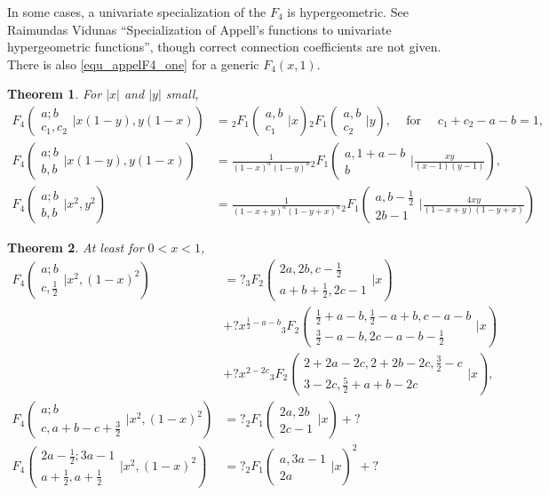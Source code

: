 \documentclass[12pt]{article}
\numberwithin{equation}{section}
\newtheorem{theorem}{Theorem}[section]
\newcommand{\Head}[3] {{}_{#1}{#2}_{#3}}
\newcommand{\ArgS}[3] {( \begin{smallmatrix} #1 \\ #2 \end{smallmatrix} | {#3})}
\newcommand{\appellFfourS}[6]    {F_4 \ArgS{{#1};{#2}}{{#3},{#4}}{{#5},{#6}}}
\begin{document}
In some cases, a univariate specialization of the $F_4$ is hypergeometric. See Raimundas Vidunas ``Specialization of Appell's functions to univariate hypergeometric functions'', though correct connection coefficients are not given. There is also \eqref{equ_appelF4_one} for a generic $F_4(x,1)$.
\begin{theorem}
\label{thm_f4_reduce}
For $|x|$ and $|y|$ small,
\begin{align*}
\appellFfourS{a}{b}{c_1}{c_2}{x(1-y)}{y(1-x)} &= \Head{2}{F}{1}\ArgS{a,b}{c_1}{x} \Head{2}{F}{1}\ArgS{a,b}{c_2}{y}\text{,} \quad \text{ for } \quad c_1+c_2-a-b = 1\text{,}\\
\appellFfourS{a}{b}{b}{b}{x(1-y)}{y(1-x)} &= \tfrac{1}{(1-x)^{a}(1-y)^{a}} \Head{2}{F}{1}\ArgS{a,1+a-b}{b}{\tfrac{x y}{(x-1)(y-1)}}\text{,}\\
\appellFfourS{a}{b}{b}{b}{x^2}{y^2} &= \tfrac{1}{(1-x+y)^{a}(1-y+x)^{a}} \Head{2}{F}{1}\ArgS{a,b-\frac12}{2b-1}{\tfrac{4 x y}{(1-x+y) (1-y+x)}}
\end{align*}
\end{theorem}

\begin{theorem}
At least for $0<x<1$,
\begin{align*}
\appellFfourS{a}{b}{c}{\frac12}{x^2}{(1-x)^2}
&= ? \Head{3}{F}{2} \ArgS{2a,2b,c-\frac12}{a+b+\frac12,2c-1}{x}\\
&+ ? x^{\frac12-a-b} \Head3F2 \ArgS{\frac{1}{2}+a-b,\frac{1}{2}-a+b,c-a-b}{\frac{3}{2}-a-b,2c-a-b-\frac{1}{2}}{x}\\
&+ ? x^{2 - 2 c} \Head3F2 \ArgS{2 + 2 a - 2 c, 2 + 2 b - 2 c, \frac32 - c}{3 - 2 c, \frac52 + a + b - 2 c}{x}\text{,}\\
\appellFfourS{a}{b}{c}{a+b-c+\frac32}{x^2}{(1-x)^2} &= ? \Head{2}{F}{1} \ArgS{2a,2b}{2c-1}{x} + ?\\
\appellFfourS{2a-\frac12}{3a-1}{a+\frac12}{a+\frac12}{x^2}{(1-x)^2} &= ? \Head{2}{F}{1} \ArgS{a,3a-1}{2a}{x}^2 + ?
\end{align*}
\end{theorem}
\end{document}
